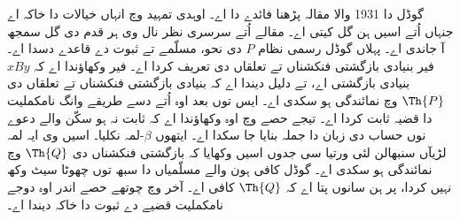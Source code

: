 \documentclass[../../../include/open-logic-section]{subfiles}
\begin{document}


گوڈل دا 1931 والا مقالہ پڑھنا فائدے دا اے۔ اوہدی تمہید وچ
انہاں خیالات دا خاکہ اے جنہاں اُتے اسیں ہن گل کیتی اے۔
مقالے اُتے سرسری نظر نال وی ہر قدم دی گل سمجھ آ جاندی اے۔
پہلاں گوڈل رسمی نظام $P$ دی نحو، مسلّمے تے ثبوت دے قاعدے
دسدا اے۔ فیر بنیادی بازگشتی فنکشناں تے تعلقاں دی تعریف
کردا اے۔ فیر وکھاؤندا اے کہ $x B y$ بنیادی بازگشتی اے،
تے دلیل دیندا اے کہ بنیادی بازگشتی فنکشناں تے تعلقاں دی
$\Th{P}$ وچ نمائندگی ہو سکدی اے۔ ایس توں بعد اوہ اُتے
دسے طریقے وانگ نامکملیت دا قضیہ ثابت کردا اے۔ تیجے حصے وچ
اوہ وکھاؤندا اے کہ ثابت نہ ہو سکّن والے دعوے نوں حساب دی
زبان دا جملہ بنایا جا سکدا اے۔ ایتھوں $\beta$-لمہ نکلیا۔
اسیں وی ایہ لمہ لڑیآں سنبھالن لئی ورتیا سی جدوں اسیں وکھایا
کہ بازگشتی فنکشناں دی $\Th{Q}$ وچ نمائندگی ہو سکدی اے۔
گوڈل کافی ہون والے مسلّمیاں دا سبھ توں چھوٹا سیٹ وکھ نہیں
کردا، پر ہن سانوں پتا اے کہ $\Th{Q}$ کافی اے۔ آخر وچ
چوتھے حصے اندر اوہ دوجے نامکملیت قضیے دے ثبوت دا خاکہ دیندا اے۔
\end{document}
